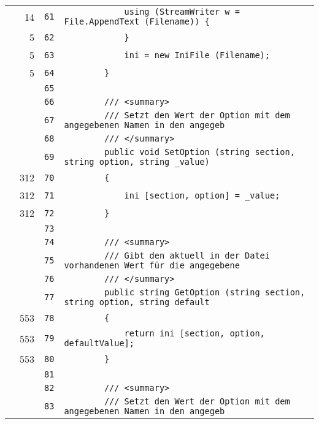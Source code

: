 \documentclass[a4paper,10pt]{article}
\begin{document}
\begin{longtable}[l]{lrrl}
\cellcolor{green} & 14 & \verb~61~ & \verb~            using (StreamWriter w = File.AppendText (Filename)) {~\\
\cellcolor{green} & 5 & \verb~62~ & \verb~            }~\\
\cellcolor{green} & 5 & \verb~63~ & \verb~            ini = new IniFile (Filename);~\\
\cellcolor{green} & 5 & \verb~64~ & \verb~        }~\\
\cellcolor{gray} &  & \verb~65~ & \verb~~\\
\cellcolor{gray} &  & \verb~66~ & \verb~        /// <summary>~\\
\cellcolor{gray} &  & \verb~67~ & \verb~        /// Setzt den Wert der Option mit dem angegebenen Namen in den angegeb~\\
\cellcolor{gray} &  & \verb~68~ & \verb~        /// </summary>~\\
\cellcolor{gray} &  & \verb~69~ & \verb~        public void SetOption (string section, string option, string _value)~\\
\cellcolor{green} & 312 & \verb~70~ & \verb~        {~\\
\cellcolor{green} & 312 & \verb~71~ & \verb~            ini [section, option] = _value;~\\
\cellcolor{green} & 312 & \verb~72~ & \verb~        }~\\
\cellcolor{gray} &  & \verb~73~ & \verb~~\\
\cellcolor{gray} &  & \verb~74~ & \verb~        /// <summary>~\\
\cellcolor{gray} &  & \verb~75~ & \verb~        /// Gibt den aktuell in der Datei vorhandenen Wert für die angegebene ~\\
\cellcolor{gray} &  & \verb~76~ & \verb~        /// </summary>~\\
\cellcolor{gray} &  & \verb~77~ & \verb~        public string GetOption (string section, string option, string default~\\
\cellcolor{green} & 553 & \verb~78~ & \verb~        {~\\
\cellcolor{green} & 553 & \verb~79~ & \verb~            return ini [section, option, defaultValue];~\\
\cellcolor{green} & 553 & \verb~80~ & \verb~        }~\\
\cellcolor{gray} &  & \verb~81~ & \verb~~\\
\cellcolor{gray} &  & \verb~82~ & \verb~        /// <summary>~\\
\cellcolor{gray} &  & \verb~83~ & \verb~        /// Setzt den Wert der Option mit dem angegebenen Namen in den angegeb~\\

\end{longtable}
\end{document}
